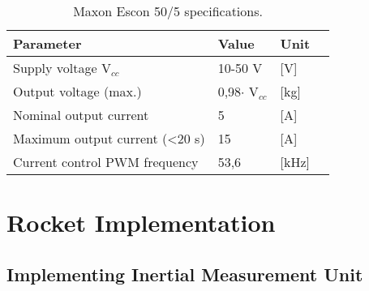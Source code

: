 \begin{table}[htbp]
	\centering
	\begin{tabular}{llll}
	\hline
	Parameter & Value & Unit \\ \hline
	Supply voltage V$_{cc}$& 10-50 V & {[}V{]} \\
	Output voltage (max.) & 0,98$\cdot$ V$_{cc}$& {[}kg{]} \\
	Nominal output current & 5 & {[}A{]} \\
	Maximum output current (<20 s) & 15 & {[}A{]}\\
	Current control PWM frequency & 53,6 & {[}kHz{]}
	\end{tabular}
\caption{Maxon Escon 50/5 specifications.}
\label{MaxonSpecifications}
\end{table}



\section{Rocket Implementation}

\subsection{Implementing Inertial Measurement Unit}

